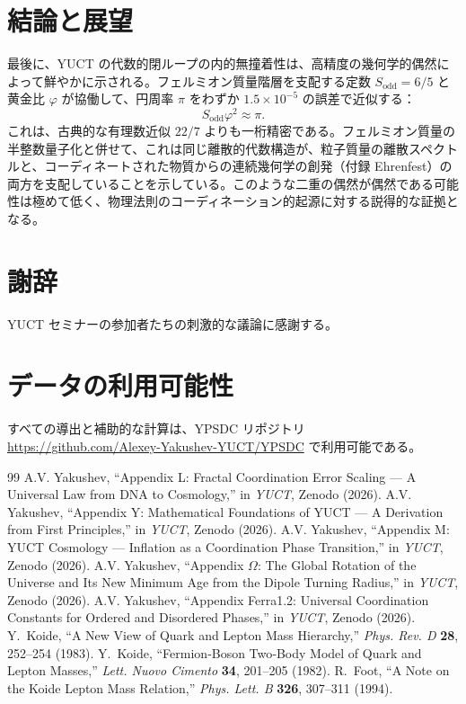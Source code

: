 \documentclass[11pt,a4paper]{article}
\theoremstyle{remark}
\begin{document}
	\section*{結論と展望}
	
	最後に、YUCT の代数的閉ループの内的無撞着性は、高精度の幾何学的偶然によって鮮やかに示される。フェルミオン質量階層を支配する定数 \(S_{\mathrm{odd}}=6/5\) と黄金比 \(\varphi\) が協働して、円周率 \(\pi\) をわずか \(1.5\times10^{-5}\) の誤差で近似する：
	\[
	S_{\mathrm{odd}}\varphi^2 \approx \pi .
	\]
	これは、古典的な有理数近似 \(22/7\) よりも一桁精密である。フェルミオン質量の半整数量子化と併せて、これは同じ離散的代数構造が、粒子質量の離散スペクトルと、コーディネートされた物質からの連続幾何学の創発（付録 Ehrenfest）の両方を支配していることを示している。このような二重の偶然が偶然である可能性は極めて低く、物理法則のコーディネーション的起源に対する説得的な証拠となる。
	
	\section*{謝辞}
	
	YUCT セミナーの参加者たちの刺激的な議論に感謝する。
	
	\section*{データの利用可能性}
	
	すべての導出と補助的な計算は、YPSDC リポジトリ \url{https://github.com/Alexey-Yakushev-YUCT/YPSDC} で利用可能である。
	
	\begin{thebibliography}{99}
		 A.V. Yakushev, ``Appendix L: Fractal Coordination Error Scaling — A Universal Law from DNA to Cosmology,'' in \emph{YUCT}, Zenodo (2026).
		 A.V. Yakushev, ``Appendix Y: Mathematical Foundations of YUCT — A Derivation from First Principles,'' in \emph{YUCT}, Zenodo (2026).
		 A.V. Yakushev, ``Appendix M: YUCT Cosmology — Inflation as a Coordination Phase Transition,'' in \emph{YUCT}, Zenodo (2026).
		 A.V. Yakushev, ``Appendix $\Omega$: The Global Rotation of the Universe and Its New Minimum Age from the Dipole Turning Radius,'' in \emph{YUCT}, Zenodo (2026).
		 A.V. Yakushev, ``Appendix Ferra1.2: Universal Coordination Constants for Ordered and Disordered Phases,'' in \emph{YUCT}, Zenodo (2026).
		 Y.~Koide, ``A New View of Quark and Lepton Mass Hierarchy,''
		\emph{Phys. Rev. D} \textbf{28}, 252--254 (1983).
		 Y.~Koide, ``Fermion‑Boson Two‑Body Model of Quark and Lepton Masses,''
		\emph{Lett. Nuovo Cimento} \textbf{34}, 201--205 (1982).
		 R.~Foot, ``A Note on the Koide Lepton Mass Relation,''
		\emph{Phys. Lett. B} \textbf{326}, 307--311 (1994).
	\end{thebibliography}
	
\end{document}
